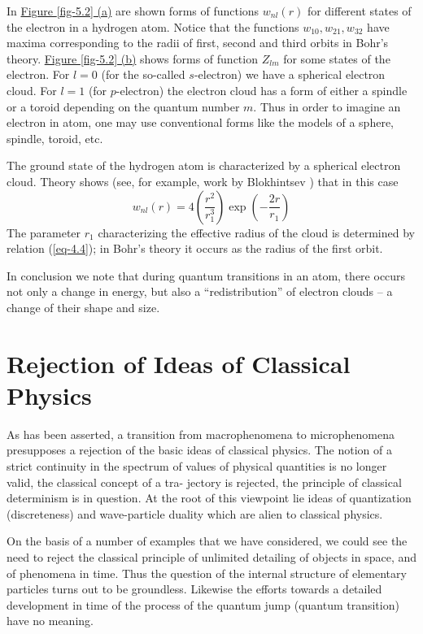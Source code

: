 \documentclass[a4paper,sfsidenotes,colorlinks=true]{tufte-book}
\numberwithin{equation}{section}
\numberwithin{figure}{section}
\begin{document}
In \hyperref[fig-5.2]{Figure \ref{fig-5.2} (a)} are shown forms of
functions $w_{nl} (r)$ for different states of the electron in a
hydrogen atom. Notice that the functions $w_{10}, w_{21}, w_{32}$ have
maxima corresponding to the radii of first, second and third orbits in
Bohr's theory. \hyperref[fig-5.2]{Figure \ref{fig-5.2} (b)} shows
forms of function $Z_{lm}$ for some states of the electron. For $l =
0$ (for the so-called $s$-electron) we have a spherical electron
cloud. For $l= 1$ (for $p$-electron) the electron cloud has a form of
either a spindle or a toroid depending on the quantum number $m$. Thus
in order to imagine an electron in atom, one may use conventional
forms like the models of a sphere, spindle, toroid, etc.

The ground state of the hydrogen atom is characterized
 by a spherical electron cloud. Theory shows (see, for example, work
 by Blokhintsev \cite[-1cm]{blokhintsev-1964})
 that in this case 
\begin{equation}%
w_{nl}(r) = 4 \left( \frac{r^{2}}{r_{1}^{3}} \right) \exp \left( -\frac{2r}{r_{1}} \right)
\label{eq-5.4} 
\end{equation}
The parameter $r_{1}$ characterizing the effective radius of the cloud
is determined by relation (\ref{eq-4.4}); in Bohr's theory it occurs as the
radius of the first orbit. 

In conclusion we note that during quantum transitions in an atom,
there occurs not only a change in energy, but also a ``redistribution''
of electron clouds -- a change of their shape and size.


\section{Rejection of Ideas of Classical Physics}
\label{sec-06}
As has  been asserted, a transition from
macrophenomena to microphenomena presupposes a rejection of the
basic ideas of classical physics. The notion of a strict continuity in
the spectrum of values of physical quantities is no longer valid,
the classical concept of a tra- jectory is rejected, the principle of
classical determinism is in question. At the root of this viewpoint
lie ideas of quantization (discreteness) and wave-particle duality
which are alien to classical physics.

On the basis of a number of examples that we have considered, we could
see the need to reject the classical principle of unlimited detailing
of objects in space, and of phenomena in time. Thus the question of
the internal structure of elementary particles turns out to be
groundless. Likewise the efforts towards a detailed development in
time of the process of the quantum jump (quantum transition) have no
meaning.
\end{document}
